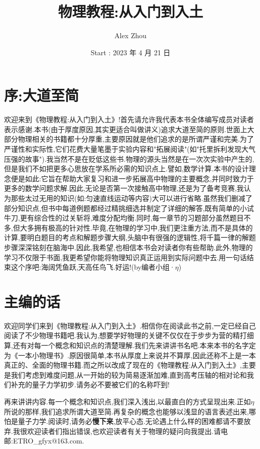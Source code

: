 \documentclass[UTF8,a4paper]{ctexrep}
\title{{\Huge 物理教程:从入门到入土}}
\author{{\large Alex Zhou}}
\date{{\large Start : 2023 年 4 月 21 日}}
\begin{document}
	\maketitle 
	\setcounter{page}{0}
	\section*{序:大道至简}
    欢迎来到《物理教程:从入门到入土》!首先请允许我代表本书全体编写成员对读者表示感谢.本书(由于厚度原因,其实更适合叫做讲义)追求大道至简的原则.世面上大部分物理相关的书籍都十分厚重,主要原因就是他们追求的是所谓严谨和完美.为了严谨性和实际性,它们花费大量笔墨于实验内容和"拓展阅读"(如"托里拆利发现大气压强的故事").我当然不是在贬低这些书.物理的源头当然是在一次次实验中产生的,但是我们不如把更多心思放在学系所必需的知识点上.譬如,数学计算.本书的设计理念便是如此:它旨在帮助大家复习和进一步拓展高中物理的主要概念,并同时致力于更多的数学问题求解.因此,无论是否第一次接触高中物理,还是为了备考竞赛,我认为那些太过无用的知识(如:匀速直线运动等内容)大可以进行省略.虽然我们删减了部分知识点,但书中每道例题都经过精挑细选并制定了详细的解答,既有简单的小试牛刀,更有综合性的过关斩将,难度分配均衡.同时,每一章节的习题部分虽然题目不多,但大多拥有极高的针对性.毕竟,在物理的学习中,我们更注重方法,而不是具体的计算,要明白题目的考点和解题步骤大纲,头脑中有很强的逻辑性,将千篇一律的解题步骤深深铭刻在脑海中.因此,我希望,也相信本书会对读者你有些帮助.此外,物理的学习不仅限于书面,我更希望你能将物理知识真正运用到实际问题中去.用一句话结束这个序吧:海阔凭鱼跃,天高任鸟飞.好运!(by编者小组·$\eta$)
	\section*{主编的话}
	欢迎同学们来到《物理教程:从入门到入土》.相信你在阅读此书之前,一定已经自己阅读了不少物理书籍吧.我认为,想要学好物理的关键不仅仅在于步步为营的精打细算,还有对每一个概念和知识点的清楚理解.我们先来讲讲书名吧.本来本书的名字定为《一本小物理书》.原因很简单,本书从厚度上来说并不算厚,因此还称不上是一本真正的、全面的物理书籍.而之所以改成了现在的《物理教程:从入门到入土》,主要是我们考虑到难度问题,从一开始的较为简易逐渐加难,直到高考压轴的相对论和我们补充的量子力学初步.请务必不要被它们的名称吓到!


	再来讲讲内容.每一个概念和知识点,我们深入浅出,以最直白的方式呈现出来.正如$\eta$所说的那样,我们追求所谓大道至简.再复杂的概念也能够以浅显的语言表述出来,哪怕是量子力学.阅读时,请务必\textbf{慢下来},放平心态.无论遇上什么样的困难都请不要放弃.我很欢迎读者们指出错误,也欢迎读者有关于物理的疑问向我提出.请电邮:ETRO\_gfyx@163.com.
\end{document}
